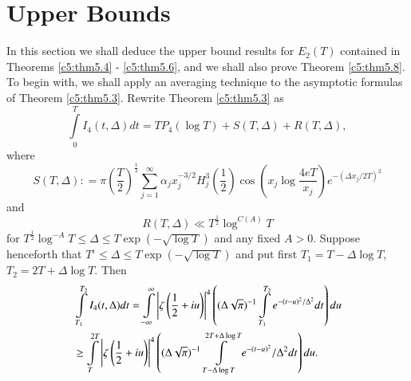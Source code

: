 \section{Upper Bounds}\label{c5:sec5.6}

In this section we shall deduce the upper bound results for $E_2(T)$
contained in Theorems \ref{c5:thm5.4} - \ref{c5:thm5.6}, and we shall
also prove Theorem \ref{c5:thm5.8}. To begin with, we shall apply an
averaging  technique to the asymptotic formulas of Theorem
\ref{c5:thm5.3}. Rewrite Theorem \ref{c5:thm5.3} as  
\begin{equation}
\int\limits^T_0 I_4 (t,\Delta) dt = TP_4 (\log T) + S(T,\Delta) +
R(T,\Delta),\label{c5:eq5.157} 
\end{equation}
where
{\fontsize{10pt}{12pt}\selectfont
\begin{equation}
S (T,\Delta): = \pi \left(\frac{T}{2} \right)^{\frac{1}{2}}
\sum\limits^{\infty}_{j=1} \alpha_j x^{-3/2}_j H^3_j \left(\frac{1}{2}
\right) \cos \left(x_j \log \frac{4eT}{x_j} \right) e^{-(\Delta
  x_j/2T)^2} \label{c5:eq5.158}
\end{equation}}
and 
\begin{equation}
R(T,\Delta) \ll T^{\frac{1}{2}} \log^{C(A)} T\label{c5:eq5.159}
\end{equation}
for $T^{\frac{1}{2}} \log^{-A} T \leq \Delta \leq T \exp (-\sqrt{\log
  T})$ and any fixed $A>0$. Suppose henceforth that $T^\epsilon \leq
\Delta \leq T \exp (-\sqrt{\log T})$ and put first $T_1 = T - \Delta
\log T$, $T_2 = 2 T + \Delta \log T$. Then  
\begin{align}
& \int\limits^{T_2}_{T_1} I_4 (t,\Delta) dt =
  \int\limits^\infty_{-\infty} \left|\zeta \left(\frac{1}{2} + i u
  \right)\right|^4 \left((\Delta \sqrt{\pi})^{-1}
  \int\limits^{T_2}_{T_1} e^{-(t-u)^{2} /\Delta^2}dt\right)
  du\label{c5:eq5.160}\\ 
& \geq \int\limits^{2T}_T \left|\zeta \left(\frac{1}{2} + iu
  \right)\right|^4 \left((\Delta \sqrt{\pi})^{-1} \int\limits^{2T +
    \Delta \log T}_{T-\Delta \log T} e^{-(t-u)^2} /\Delta^2 dt \right)
  du.\notag   
\end{align} 

